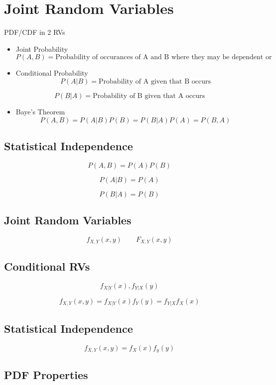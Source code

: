 \documentclass{article}
\begin{document}
\section{Joint Random Variables}

PDF/CDF in 2 RVs

\begin{itemize}
\item
  Joint Probability \[
  P(A, B) = \textrm{Probability of occurances of A and B where they
  may be dependent or independent}
  \]
\item
  Conditional Probability \[
  P(A|B) = \textrm{Probability of A given that B occurs}
  \]
\end{itemize}

\[
P(B|A) = \textrm{Probability of B given that A occurs}
\]

\begin{itemize}
\item
  Baye's Theorem \[
  P(A, B) = P(A|B)P(B) = P(B|A)P(A) = P(B, A)
  \]
\end{itemize}

\subsection{Statistical Independence}

\[
P(A, B) = P(A)P(B)
\]

\[
P(A|B) = P(A)
\]

\[
P(B|A) = P(B)
\]

\subsection{Joint Random Variables}

\[
f_{X, Y}(x, y) \qquad F_{X, Y}(x, y)
\]

\subsection{Conditional RVs}

\[
f_{X|Y}(x), f_{Y|X}(y)
\]

\[
f_{X, Y}(x, y) = f_{X|Y}(x)f_Y(y) = f_{Y|X}f_X(x)
\]

\subsection{Statistical Independence}

\[
f_{X, Y}(x, y) = f_X(x)f_y(y)
\]

\subsection{PDF Properties}
\end{document}

